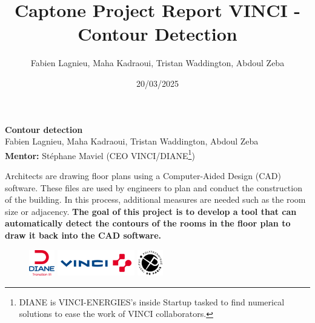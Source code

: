 \documentclass[11pt]{article}
\title{Captone Project Report VINCI - Contour Detection}
\author{Fabien Lagnieu, Maha Kadraoui, Tristan Waddington, Abdoul Zeba}
\date{20/03/2025}
\begin{document}
\begin{center}
\textbf{Contour detection} \\
Fabien Lagnieu, Maha Kadraoui, Tristan Waddington, Abdoul Zeba\\
\textbf{Mentor:} Stéphane Maviel (CEO VINCI/DIANE\footnote{DIANE is VINCI-ENERGIES's inside Startup tasked to find numerical solutions
to ease the work of VINCI collaborators.}) \\\vspace{2em}
\textbf{\Large }
\end{center}
\vspace{-1cm}

Architects are drawing floor plans using a Computer-Aided Design (CAD) software. These files are used
by engineers to plan and conduct the construction of the building. In this process,
additional measures are needed such as the room size or adjacency. \textbf{The goal of 
this project is to develop a tool that can automatically detect the contours of 
the rooms in the floor plan to draw it back into the CAD software.}

\begin{figure}[h]
    \centering
    \includegraphics[width=0.1\textwidth]{figures/Diane.png}
    \hspace{0.1\textwidth}
    \includegraphics[width=0.3\textwidth]{figures/logo_vinci.png}
    \hspace{0.1\textwidth}
    \includegraphics[width=0.1\textwidth]{figures/ipparis.png}

    \label{fig:my_label}
\end{figure}
\end{document}
